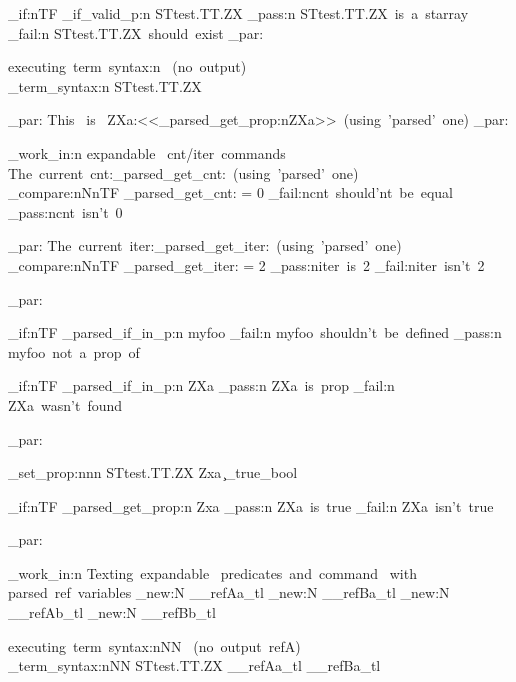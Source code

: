 \documentclass{article}
\begin{document}
\bool_if:nTF {\starray_if_valid_p:n {STtest.TT.ZX}}
  {\sttests_pass:n {STtest.TT.ZX~is~a~starray}}
  { \sttests_fail:n {STtest.TT.ZX~should~exist}}
\sttests_par:

executing~term~syntax:n ~(no~output)\\
\starray_term_syntax:n {STtest.TT.ZX}

\sttests_par:
This~ is~ ZXa:<<\starray_parsed_get_prop:n{ZXa}>>~(using~'parsed'~one)
\sttests_par:

\sttests_work_in:n {expandable~ cnt/iter~commands}
The~current~cnt:\starray_parsed_get_cnt:~(using~'parsed'~one)\\

\int_compare:nNnTF {\starray_parsed_get_cnt:} = {0}
  {\sttests_fail:n{cnt~should'nt~be~equal}} 
  {\sttests_pass:n{cnt~isn't~0}}
  
\sttests_par:
The~current~iter:\starray_parsed_get_iter:~(using~'parsed'~one)\\

\int_compare:nNnTF {\starray_parsed_get_iter:} = {2}
  {\sttests_pass:n{iter~is~2}} 
  {\sttests_fail:n{iter~isn't~2}}



\sttests_par:

\bool_if:nTF { \starray_parsed_if_in_p:n {myfoo} }
  {  \sttests_fail:n {myfoo~shouldn't~be~defined } }
  {   \sttests_pass:n {myfoo~not~a~prop~of } }

\bool_if:nTF { \starray_parsed_if_in_p:n {ZXa} }
  {  \sttests_pass:n {ZXa~is~prop } }
  {   \sttests_fail:n {ZXa~wasn't~found } }





\sttests_par:


  
\starray_set_prop:nnn {STtest.TT.ZX}  {Zxa} {\c_true_bool}

\bool_if:nTF { \starray_parsed_get_prop:n {Zxa} }
  {  \sttests_pass:n {ZXa~is~true } }
  {   \sttests_fail:n {ZXa~isn't~true } }
  
  
  \sttests_par:
  
  
\sttests_work_in:n {Texting~expandable~ predicates~and~command~ with~ parsed~ref~variables}
\tl_new:N \__refAa_tl
\tl_new:N \__refBa_tl
\tl_new:N \__refAb_tl
\tl_new:N \__refBb_tl



executing~term~syntax:nNN ~(no~output~refA)\\
\starray_term_syntax:nNN {STtest.TT.ZX} \__refAa_tl \__refBa_tl
\end{document}
